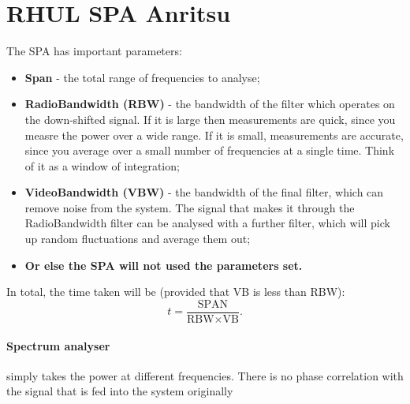 \section{RHUL SPA Anritsu}
  The SPA has important parameters:
  \begin{itemize}
  	\item \textbf{Span} - the total range of frequencies to analyse;
  	\item \textbf{RadioBandwidth (RBW)} - the bandwidth of the filter which operates on the down-shifted signal. If it is large then measurements are quick, since you measre the power over a wide range. If it is small, measurements are accurate, since you average over a small number of frequencies at a single time. Think of it as a window of integration;
  	\item \textbf{VideoBandwidth (VBW)} - the bandwidth of the final filter, which can remove noise from the system. The signal that makes it through the RadioBandwidth filter can be analysed with a further filter, which will pick up random fluctuations and average them out;
  	\item \textbf{ Or else the SPA will not used the parameters set.}
  \end{itemize}
  
  In total, the time taken will be (provided that VB is less than RBW):
  \[
  t = \frac{\text{SPAN}}{\text{RBW}\times\text{VB}}.
  \]
  
   
  \paragraph{Spectrum analyser} simply takes the power at different frequencies. There is no phase correlation with the signal that is fed into the system originally
  \begin{figure}[h]
  \end{figure}
 \newpage
 